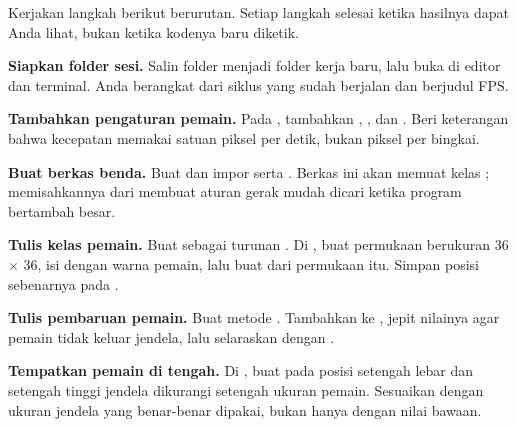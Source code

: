 
Kerjakan langkah berikut berurutan. Setiap langkah selesai ketika hasilnya
dapat Anda lihat, bukan ketika kodenya baru diketik.

\begin{langkah}
  \item \textbf{Siapkan folder sesi.} Salin folder  menjadi
        folder kerja baru, lalu buka di editor dan terminal. Anda berangkat
        dari siklus yang sudah berjalan dan berjudul FPS.

  \item \textbf{Tambahkan pengaturan pemain.} Pada
        , tambahkan ,
        , dan . Beri keterangan
        bahwa kecepatan memakai satuan piksel per detik, bukan piksel per
        bingkai.

  \item \textbf{Buat berkas benda.} Buat 
        dan impor  serta . Berkas ini akan memuat
        kelas ; memisahkannya dari  membuat aturan
        gerak mudah dicari ketika program bertambah besar.

  \item \textbf{Tulis kelas pemain.} Buat  sebagai turunan
        . Di , buat permukaan
        berukuran 36 $\times$ 36, isi dengan warna pemain, lalu buat
         dari permukaan itu. Simpan posisi sebenarnya pada
        .

  \item \textbf{Tulis pembaruan pemain.} Buat metode . Tambahkan  ke , jepit nilainya agar pemain
        tidak keluar jendela, lalu selaraskan  dengan
        .

  \item \textbf{Tempatkan pemain di tengah.} Di , buat
         pada posisi setengah lebar dan setengah tinggi jendela
        dikurangi setengah ukuran pemain. Sesuaikan 
        dengan ukuran jendela yang benar-benar dipakai, bukan hanya dengan
        nilai bawaan.


\end{langkah}
